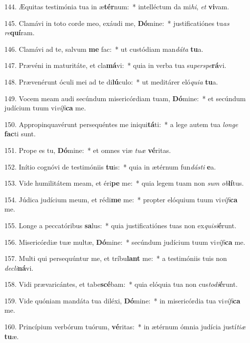 144. Æquitas testimónia tua in æ\textbf{tér}num:~*  intelléctum da mi\textit{hi}, \textit{et} \textbf{vi}vam.\

145. Clamávi in toto corde meo, exáudi me, \textbf{Dó}mine:~*  justificatiónes tu\textit{as} \textit{re}\textbf{quí}ram.\

146. Clamávi ad te, salvum \textbf{me} fac:~*  ut custódiam man\textit{dá}\textit{ta} \textbf{tu}a.\

147. Prævéni in maturitáte, et cla\textbf{má}vi:~*  quia in verba tua su\textit{per}\textit{spe}\textbf{rá}vi.\

148. Prævenérunt óculi mei ad te di\textbf{lú}culo:~*  ut meditárer eló\textit{qui}\textit{a} \textbf{tu}a.\

149. Vocem meam audi secúndum misericórdiam tuam, \textbf{Dó}mine:~*  et secúndum judícium tuum vi\textit{ví}\textit{fi}\textbf{ca} me.\

150. Appropinquavérunt persequéntes me iniqui\textbf{tá}ti:~*  a lege autem tua \textit{lon}\textit{ge} \textbf{fac}ti sunt.\

151. Prope es tu, \textbf{Dó}mine:~*  et omnes viæ \textit{tu}\textit{æ} \textbf{vé}ritas.\

152. Inítio cognóvi de testimóniis \textbf{tu}is:~*  quia in ætérnum fun\textit{dás}\textit{ti} \textbf{e}a.\

153. Vide humilitátem meam, et éri\textbf{pe} me:~*  quia legem tuam non \textit{sum} \textit{ob}\textbf{lí}tus.\

154. Júdica judícium meum, et rédi\textbf{me} me:~*  propter elóquium tuum vi\textit{ví}\textit{fi}\textbf{ca} me.\

155. Longe a peccatóribus \textbf{sa}lus:~*  quia justificatiónes tuas non ex\textit{qui}\textit{si}\textbf{é}runt.\

156. Misericórdiæ tuæ multæ, \textbf{Dó}mine:~*  secúndum judícium tuum vi\textit{ví}\textit{fi}\textbf{ca} me.\

157. Multi qui persequúntur me, et tríbu\textbf{lant} me:~*  a testimóniis tuis non \textit{de}\textit{cli}\textbf{ná}vi.\

158. Vidi prævaricántes, et tabe\textbf{scé}bam:~*  quia elóquia tua non cus\textit{to}\textit{di}\textbf{é}runt.\

159. Vide quóniam mandáta tua diléxi, \textbf{Dó}mine:~*  in misericórdia tua vi\textit{ví}\textit{fi}\textbf{ca} me.\

160. Princípium verbórum tuórum, \textbf{vé}ritas:~*  in ætérnum ómnia judícia justí\textit{ti}\textit{æ} \textbf{tu}æ.\

